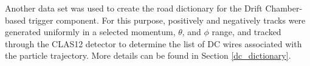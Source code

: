 Another data set was used to create the road dictionary for the Drift Chamber-based trigger component.
For this purpose, positively and negatively tracks were generated uniformly  in a selected momentum, $\theta$,
and $\phi$ range, and tracked through the CLAS12 detector to determine the list of DC wires associated with
the particle trajectory. More details can be found in Section \ref{dc_dictionary}.
